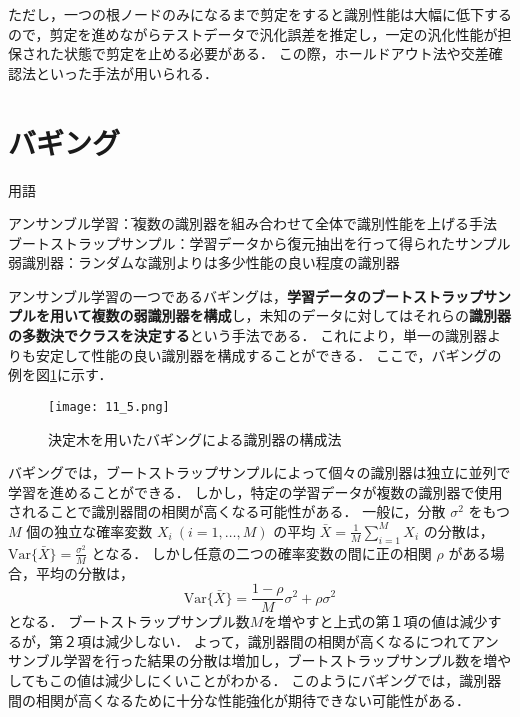 \documentclass[dvipdfmx]{jreport}
\begin{document}
ただし，一つの根ノードのみになるまで剪定をすると識別性能は大幅に低下するので，剪定を進めながらテストデータで汎化誤差を推定し，一定の汎化性能が担保された状態で剪定を止める必要がある．
この際，ホールドアウト法や交差確認法といった手法が用いられる．


\section{バギング}

\begin{itembox}[l]{\large{用語}}
    \begin{tabbing}
        \hspace{15pt} \raisebox{0.5ex}{\tiny $\bullet$} アンサンブル学習\hspace{43pt}\=：複数の識別器を組み合わせて全体で識別性能を上げる手法\\[0.5em]
        \hspace{15pt} \raisebox{0.5ex}{\tiny $\bullet$} ブートストラップサンプル\>：学習データから復元抽出を行って得られたサンプル\\[0.5em]
        \hspace{15pt} \raisebox{0.5ex}{\tiny $\bullet$} 弱識別器\>：ランダムな識別よりは多少性能の良い程度の識別器
    \end{tabbing}
\end{itembox}

アンサンブル学習の一つであるバギングは，\textbf{学習データのブートストラップサンプルを用いて複数の弱識別器を構成}し，未知のデータに対してはそれらの\textbf{識別器の多数決でクラスを決定する}という手法である．
これにより，単一の識別器よりも安定して性能の良い識別器を構成することができる．
ここで，バギングの例を図\ref{fig:5}に示す．
\begin{figure}[h]
    \begin{center}
        \texttt{[image: 11\_5.png]}
        \caption{決定木を用いたバギングによる識別器の構成法}\label{fig:5}
    \end{center}
\end{figure}

バギングでは，ブートストラップサンプルによって個々の識別器は独立に並列で学習を進めることができる．
しかし，特定の学習データが複数の識別器で使用されることで識別器間の相関が高くなる可能性がある．
一般に，分散 $\sigma^2$ をもつ $M$ 個の独立な確率変数 $X_i\ (i = 1, \dots, M)$ の平均 $\bar{X} = \frac{1}{M} \sum_{i=1}^{M} X_i$ の分散は，$\mathrm{Var}\{\bar{X}\} = \frac{\sigma^2}{M}$
となる．
しかし任意の二つの確率変数の間に正の相関 $\rho$ がある場合，平均の分散は，
\begin{equation}
    \mathrm{Var}\{\bar{X}\} = \frac{1-\rho}{M}\sigma^2 + \rho\sigma^2 \label{eq:19}
\end{equation}
となる．
ブートストラップサンプル数$M$を増やすと上式の第１項の値は減少するが，第２項は減少しない．
よって，識別器間の相関が高くなるにつれてアンサンブル学習を行った結果の分散は増加し，ブートストラップサンプル数を増やしてもこの値は減少しにくいことがわかる．
このようにバギングでは，識別器間の相関が高くなるために十分な性能強化が期待できない可能性がある．
\end{document}
